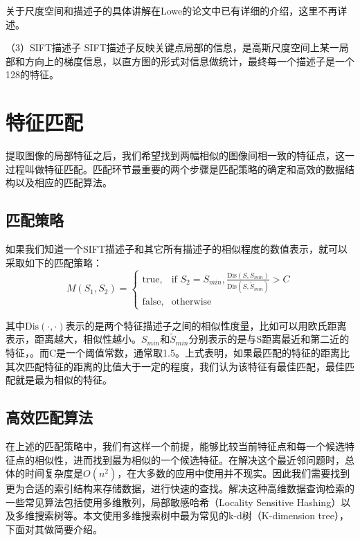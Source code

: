 关于尺度空间和描述子的具体讲解在Lowe的论文中\cite{Lowe:2004uq}已有详细的介绍，这里不再详述。

（3）SIFT描述子
SIFT描述子反映关键点局部的信息，是高斯尺度空间上某一局部和方向上的梯度信息，以直方图的形式对信息做统计，最终每一个描述子是一个128的特征。

\section{特征匹配}
提取图像的局部特征之后，我们希望找到两幅相似的图像间相一致的特征点，这一过程叫做特征匹配。匹配环节最重要的两个步骤是匹配策略的确定和高效的数据结构以及相应的匹配算法。

\subsection{匹配策略}
如果我们知道一个SIFT描述子和其它所有描述子的相似程度的数值表示，就可以采取如下的匹配策略：
\begin{equation}
  M(S_1,S_2) = 
\begin{cases} 
\text{true}, & \mbox{if } S_2 = S_{min},\frac{\text{Dis}(S,S_{min})}{\text{Dis}(S,\tilde{S}_{min})} > C \\
\text{false}, & \mbox{otherwise}
\end{cases}
\end{equation}

其中\(\text{Dis}(\cdot,\cdot)\)表示的是两个特征描述子之间的相似性度量，比如可以用欧氏距离表示，距离越大，相似性越小。\(S_{min}\)和\(\tilde{S}_{min}\)分别表示的是与S距离最近和第二近的特征，。而C是一个阈值常数，通常取1.5。上式表明，如果最匹配的特征的距离比其次匹配特征的距离的比值大于一定的程度，我们认为该特征有最佳匹配，最佳匹配就是最为相似的特征。

\subsection{高效匹配算法}
在上述的匹配策略中，我们有这样一个前提，能够比较当前特征点和每一个候选特征点的相似性，进而找到最为相似的一个候选特征。在解决这个最近邻问题时，总体的时间复杂度是\(O(n^2)\)，在大多数的应用中使用并不现实。因此我们需要找到更为合适的索引结构来存储数据，进行快速的查找。解决这种高维数据查询检索的一些常见算法包括使用多维散列，局部敏感哈希（Locality Sensitive Hashing）以及多维搜索树等。本文使用多维搜索树中最为常见的k-d树（K-dimension tree），下面对其做简要介绍。

